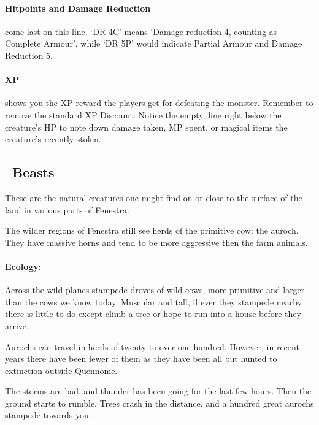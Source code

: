 \begin{multicols}{2}
\paragraph{Hitpoints and Damage Reduction} come last on this line.  `DR 4C' means `Damage reduction 4, counting as Complete Armour', while `DR 5P' would indicate Partial Armour and Damage Reduction 5.

\paragraph{XP} shows you the XP reward the players get for defeating the monster.  Remember to remove the standard XP Discount.  Notice the empty, line right below the creature's HP to note down damage taken, MP spent, or magical items the creature's recently stolen.

\subsection[Beasts]{\A\ Beasts}

These are the natural creatures one might find on or close to the surface of the land in various parts of Fenestra.

\label{auroch}

The wilder regions of Fenestra still see herds of the primitive cow: the auroch.
They have massive horns and tend to be more aggressive then the farm animals.


\paragraph{Ecology:} Across the wild planes stampede droves of wild cows, more primitive and larger than the cows we know today.  Muscular and tall, if ever they stampede nearby there is little to do except climb a tree or hope to run into a house before they arrive.

Aurochs can travel in herds of twenty to over one hundred.  However, in recent years there have been fewer of them as they have been all but hunted to extinction outside Quennome.

\begin{boxtext}

  The storms are bad, and thunder has been going for the last few hours.  Then the ground starts to rumble.  Trees crash in the distance, and a hundred great aurochs stampede towards you.


\end{boxtext}
\end{multicols}
